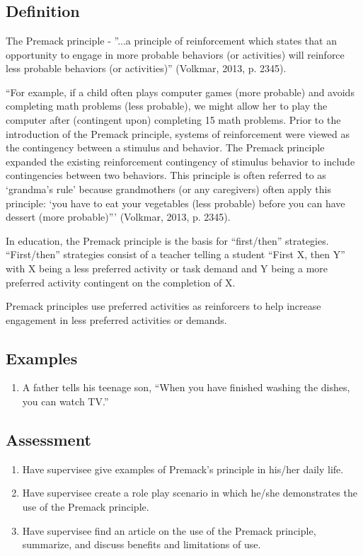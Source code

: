 \clearpage \section{\foureTen{}}
\subsection{Definition} 
The Premack principle - ''...a principle of reinforcement which states that an opportunity to engage in more probable behaviors (or activities) will reinforce less probable behaviors (or activities)'' (Volkmar, 2013, p. 2345).

``For example, if a child often plays computer games (more probable) and avoids completing math problems (less probable), we might allow her to play the computer after (contingent upon) completing 15 math problems. Prior to the introduction of the Premack principle, systems of reinforcement were viewed as the contingency between a stimulus and behavior. The Premack principle expanded the existing reinforcement contingency of stimulus behavior to include contingencies between two behaviors. This principle is often referred to as ‘grandma's rule' because grandmothers (or any caregivers) often apply this principle: ‘you have to eat your vegetables (less probable) before you can have dessert (more probable)''' (Volkmar, 2013, p. 2345).

In education, the Premack principle is the basis for ``first/then'' strategies. ``First/then'' strategies consist of a teacher telling a student ``First X, then Y'' with X being a less preferred activity or task demand and Y being a more preferred activity contingent on the completion of X.

Premack principles use preferred activities as reinforcers to help increase engagement in less preferred activities or demands. 

\subsection{Examples}
\begin{enumerate}
\item A father tells his teenage son, ``When you have finished washing the dishes, you can watch TV.''
\end{enumerate}
%
\subsection{Assessment}
\begin{enumerate}
\item Have supervisee give examples of Premack's principle in his/her daily life.
\item Have supervisee create a role play scenario in which he/she demonstrates the use of the Premack principle.
\item Have supervisee find an article on the use of the Premack principle, summarize, and discuss benefits and limitations of use.
\end{enumerate}
%

